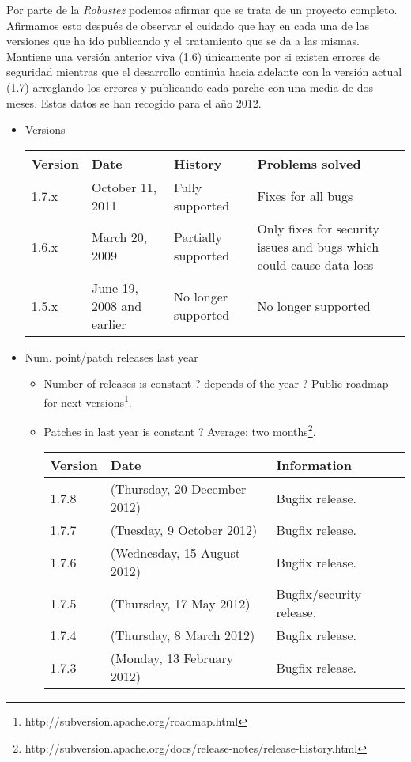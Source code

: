\documentclass[11pt]{scrartcl}
\begin{document}
\par Por parte de la \emph{Robustez} podemos afirmar que se trata de un proyecto completo. Afirmamos esto despu\'es de observar el cuidado que hay en cada una de las versiones que ha ido publicando y el tratamiento que se da a las mismas. Mantiene una versi\'on anterior viva (1.6) \'unicamente por si existen errores de seguridad mientras que el desarrollo contin\'ua hacia adelante con la versi\'on actual (1.7) arreglando los errores y publicando cada parche con una media de dos meses. Estos datos se han recogido para el a\~no 2012.

\begin{itemize}
    \item Versions

        \begin{tabular}{|l|l|l|l|}
            \hline
                {\bf Version} & {\bf Date} & {\bf History} & {\bf Problems solved}\\
            \hline
                1.7.x & October 11, 2011 & Fully supported & Fixes for all bugs\\
            \hline
                1.6.x & March 20, 2009 & Partially supported & Only fixes for security issues and bugs which could cause data loss\\
            \hline
                1.5.x & June 19, 2008 and earlier & No longer supported & No longer supported\\
            \hline
        \end{tabular}

    \item Num. point/patch releases last year
    \begin{itemize}
        \item Number of releases is constant ? depends of the year ? Public roadmap for next versions\footnote{http://subversion.apache.org/roadmap.html}.
        \item Patches in last year is constant ? Average: two months\footnote{http://subversion.apache.org/docs/release-notes/release-history.html}.

            \begin{tabular}{|l|l|l|}
                \hline Version & Date & Information\\
                \hline 1.7.8 & (Thursday, 20 December 2012) & Bugfix release.\\
                \hline 1.7.7 & (Tuesday, 9 October 2012) & Bugfix release.\\
                \hline 1.7.6 & (Wednesday, 15 August 2012) & Bugfix release.\\
                \hline 1.7.5 & (Thursday, 17 May 2012) & Bugfix/security release.\\
                \hline 1.7.4 & (Thursday, 8 March 2012) & Bugfix release.\\
                \hline 1.7.3 & (Monday, 13 February 2012) & Bugfix release.\\
                \hline
            \end{tabular}
    \end{itemize}
\end{itemize}
\end{document}
